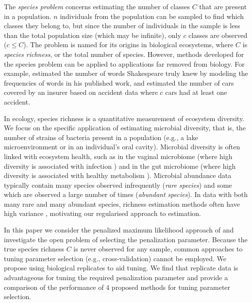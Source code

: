 \documentclass[oupdraft]{bio}
\begin{document}
The \textit{species problem} concerns estimating the number of classes $C$ that are present in a population.
$n$ individuals from the population can be sampled to find which classes they belong to, but since the  number of individuals in the sample is less than the total population size (which may be infinite), only $c$ classes are observed ($c \leq C$). The problem is named for its origins in biological ecosystems, where $C$ is \textit{species richness}, or the total number of species.  However, methods developed for the species problem can be applied to applications far removed from biology.  For example, \citet{efron_1976} estimated the number of words Shakespeare truly knew by modeling the frequencies of words in his published work, and  \citet{fegatelli_2018} estimated the number of cars covered by an insurer based on accident data where $c$ cars had at least one accident.

In ecology, species richness is a quantitative measurement of ecosystem diversity.  We focus on the specific application of estimating microbial diversity, that is, the number of strains of bacteria present in a population (e.g., a lake microenvironment or in an individual's oral cavity).
Microbial diversity is often linked with ecosystem health, such as in the vaginal microbiome (where high diversity is associated with infection \citep{Oakley:2008uo}) and in the gut microbiome (where high diversity is associated with healthy metabolism \citep{Morgan:2012bm,Minot:2019hc}).
Microbial abundance data typically contain many species observed infrequently (\textit{rare species}) and some which are observed a large number of times (\textit{abundant species}).  In data with both many rare and many abundant species, richness estimation methods often have high variance \citep{wang_2005,willis_2015}, motivating our regularised approach to estimation.

In this paper we consider the penalized maximum likelihood approach of \citet{wang_2005} and investigate the open problem of selecting the penalization parameter. Because the true species richness $C$ is never observed for any sample, common approaches to tuning parameter selection (e.g., cross-validation) cannot be employed. We propose using biological replicates to aid tuning. %
We find that replicate data is advantageous for tuning the required penalization parameter and provide a comparison of the performance of 4 proposed methods for tuning parameter selection.
\end{document}
